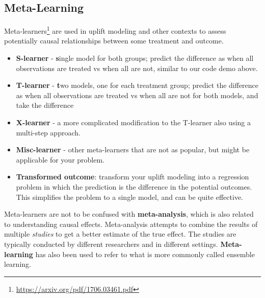 \documentclass[
  letterpaper,
]{krantz}
\providecommand{\tightlist}{%
  \setlength{\itemsep}{0pt}\setlength{\parskip}{0pt}}\usepackage{longtable,booktabs,array}
\DeclareRobustCommand{\href}[2]{#2\footnote{\url{#1}}}
\begin{document}
\subsection{Meta-Learning}\label{meta-learning}

\href{https://arxiv.org/pdf/1706.03461.pdf}{Meta-learners} are used in
uplift modeling and other contexts to assess potentially causal
relationships between some treatment and outcome.

\begin{itemize}
\tightlist
\item
  \textbf{S-learner} - \textbf{s}ingle model for both groups; predict
  the difference as when all observations are treated vs when all are
  not, similar to our code demo above.
\item
  \textbf{T-learner} - \textbf{t}wo models, one for each treatment
  group; predict the difference as when all observations are treated vs
  when all are not for both models, and take the difference
\item
  \textbf{X-learner} - a more complicated modification to the T-learner
  also using a multi-step approach.
\item
  \textbf{Misc-learner} - other meta-learners that are not as popular,
  but might be applicable for your problem.
\item
  \textbf{Transformed outcome}: transform your uplift modeling into a
  regression problem in which the prediction is the difference in the
  potential outcomes. This simplifies the problem to a single model, and
  can be quite effective.
\end{itemize}

\begin{tcolorbox}[enhanced jigsaw, colback=white, toprule=.15mm, colframe=quarto-callout-note-color-frame, breakable, leftrule=.75mm, bottomrule=.15mm, opacityback=0, left=2mm, rightrule=.15mm, arc=.35mm]
\begin{minipage}[t]{5.5mm}
\textcolor{quarto-callout-note-color}{\faInfo}
\end{minipage}%
\begin{minipage}[t]{\textwidth - 5.5mm}

Meta-learners are not to be confused with \textbf{meta-analysis}, which
is also related to understanding causal effects. Meta-analysis attempts
to combine the results of multiple \emph{studies} to get a better
estimate of the true effect. The studies are typically conducted by
different researchers and in different settings. \textbf{Meta-learning}
has also been used to refer to what is more commonly called ensemble
learning.

\end{minipage}%
\end{tcolorbox}
\end{document}
